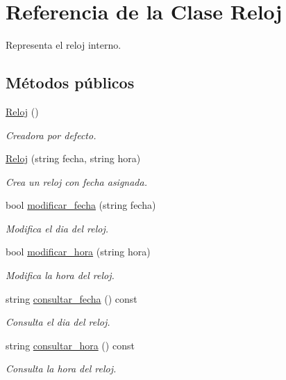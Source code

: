 \hypertarget{class_reloj}{\section{Referencia de la Clase Reloj}
\label{class_reloj}
}


Representa el reloj interno.  


\subsection*{Métodos públicos}
\begin{DoxyCompactItemize}
\item 
\hyperlink{class_reloj_a0966eaa7e7079419049e683bafa7dbc0}{Reloj} ()
\begin{DoxyCompactList}\small\item\em Creadora por defecto. \end{DoxyCompactList}\item 
\hyperlink{class_reloj_ab89b531024981f8e31250dc11e904803}{Reloj} (string fecha, string hora)
\begin{DoxyCompactList}\small\item\em Crea un reloj con fecha asignada. \end{DoxyCompactList}\item 
bool \hyperlink{class_reloj_af996940ee33d23f3d592b96338210f3b}{modificar\-\_\-fecha} (string fecha)
\begin{DoxyCompactList}\small\item\em Modifica el dia del reloj. \end{DoxyCompactList}\item 
bool \hyperlink{class_reloj_ac19961f7455f4e255fe4ef7fa809ceb1}{modificar\-\_\-hora} (string hora)
\begin{DoxyCompactList}\small\item\em Modifica la hora del reloj. \end{DoxyCompactList}\item 
string \hyperlink{class_reloj_a9864653fc4a95aec88e967d0917a800a}{consultar\-\_\-fecha} () const 
\begin{DoxyCompactList}\small\item\em Consulta el dia del reloj. \end{DoxyCompactList}\item 
string \hyperlink{class_reloj_a4d5e3ad6764d268820e204b38015e87c}{consultar\-\_\-hora} () const 
\begin{DoxyCompactList}\small\item\em Consulta la hora del reloj. \end{DoxyCompactList}\item 

\end{DoxyCompactItemize}
